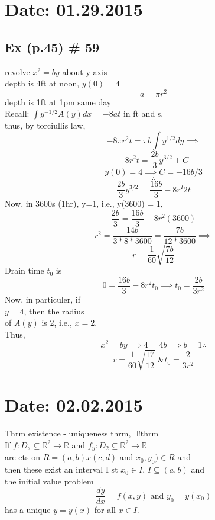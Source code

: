 \documentclass[10pt,a4paper]{article}
\begin{document}
\newpage
{}
\section{Date: 01.29.2015}

  \subsection*{Ex (p.45) \# 59} 
  revolve \(x^2 = by\) about y-axis \\	
  depth is 4ft at noon, \(y(0) = 4\)
  \[a = \pi r^2\]
  depth is 1ft at 1pm same day  \\
  Recall: \(\int y^{-1/2} A(y)dx= -8at\) in ft and s. \\
  thus, by torciullis law,  \\
  \[-8 \pi r^2t = \pi b \int y^{1/2}dy \implies \]
  \[-8r^2t = \frac{2b}{3} y^{3/2} + C\]
  \[y(0) = 4 \implies C = -16b/3\]
  \[\therefore\]
  \[\frac{2b}{3} y^{3/2}= \frac{16b}{3}-8 r^I 2t\]
  Now, in 3600s (1hr), y=1, i.e., y(3600) = 1, 
  \[\frac{2b}{3} = \frac{16b}{3}-8r^2(3600)\]
  \[r^2 = \frac{14b}{3*8*3600} = \frac{7b}{12*3600} \implies \]
  \[r = \frac{1}{60} \sqrt{\frac{7b}{12}}\]
  Drain time \(t_0\) is 
  \[0 = \frac{16b}{3} - 8r^2t_0 \implies t_0 = \frac{2b}{3r^2}\]
  Now, in particuler, if  \\
  \( y = 4 \), then the radius  \\
  of \( A(y) \) is 2, i.e., \( x = 2 \). \\ 
  Thus,
  \[x^2 = by \implies 4 = 4b \implies b=1 \therefore\]  
  \[r = \frac{1}{60} \sqrt{\frac{17}{12}}   \text{ \& } t_0 =
  \frac{2}{3r^2}\]

  \newpage
\section{Date: 02.02.2015}
  Thrm  existence - uniqueness thrm, \( \exists \text{!thrm} \)  \\	
  If \( f: D, \subseteq \mathbb{R}^2 \to  \mathbb{R} \) and \( f_y : D_2
  \subseteq \mathbb{R}^2 \to \mathbb{R}\) \\
  are cts on \( R = (a, b) x (c, d) \) and \( x_0, y_0) \in R\) and \\
  then these exist an interval I st \( x_0 \in I\), \( I \subseteq (a,
  b)\) and \\
  the initial value problem
  \[ \frac{dy}{dx} = f(x, y) \text{ and } y_0 = y(x_0)\]
  has a unique \( y = y(x) \) for all \( x \in I\). \\ 
\end{document}
